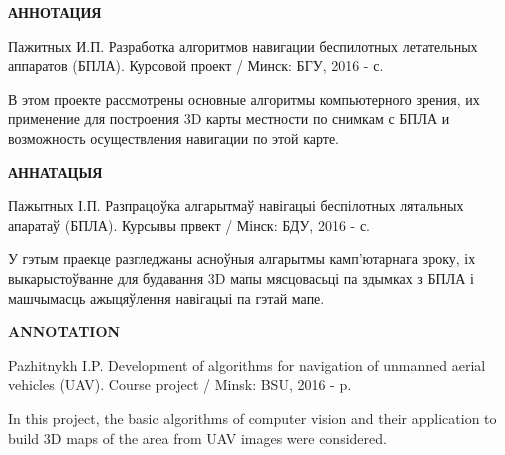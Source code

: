 \begin{center}
     \large\bfseries{АННОТАЦИЯ}
\end{center}

Пажитных И.П. Разработка алгоритмов навигации беспилотных летательных аппаратов (БПЛА). Курсовой проект / Минск: БГУ, 2016 - \pageref{LastPage} с.

В этом проекте рассмотрены основные алгоритмы компьютерного зрения, их применение для построения 3D карты местности по снимкам с БПЛА и возможность осуществления навигации по этой карте.

\begin{center}
     \large\bfseries{АННАТАЦЫЯ}
\end{center}

Пажытных І.П. Разпрацоўка алгарытмаў навігацыі беспілотных лятальных апаратаў (БПЛА). Курсывы првект / Мінск: БДУ, 2016 - \pageref{LastPage} с.

У гэтым праекце разгледжаны асноўныя алгарытмы камп'ютарнага зроку, іх выкарыстоўванне для будавання 3D мапы мясцовасьці па здымках з БПЛА і машчымасць ажыцяўлення навігацыі па гэтай мапе.

\begin{center}
     \large\bfseries{ANNOTATION}
\end{center}

Pazhitnykh I.P. Development of algorithms for navigation of unmanned aerial vehicles (UAV). Course project / Minsk: BSU, 2016 - \pageref{LastPage} p.

In this project, the basic algorithms of computer vision and their application to build 3D maps of the area from UAV images were considered. 

\newpage
